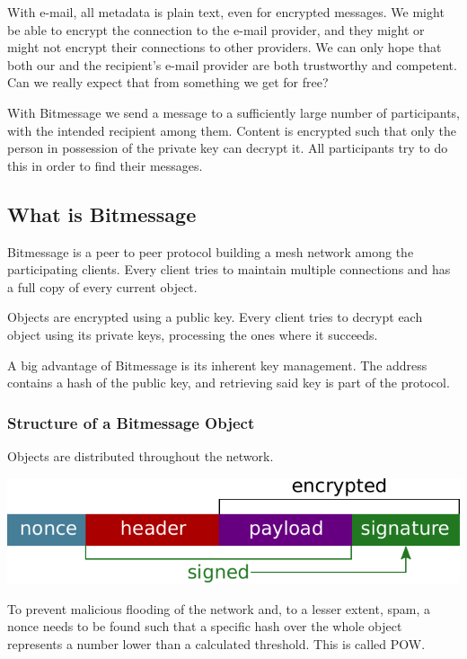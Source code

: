 \documentclass{bfh}
\begin{document}
  With e-mail, all metadata is plain text, even for encrypted messages. We might be able to encrypt the connection to the e-mail provider, and they might or might not encrypt their connections to other providers. We can only hope that both our and the recipient's e-mail provider are both trustworthy and competent. Can we really expect that from something we get for free?

  With Bitmessage we send a message to a sufficiently large number of participants, with the intended recipient among them. Content is encrypted such that only the person in possession of the private key can decrypt it. All participants try to do this in order to find their messages.

  \subsection{What is Bitmessage}
  
  Bitmessage is a peer to peer protocol building a mesh network among the participating clients. Every client tries to maintain multiple connections and has a full copy of every current object.
  
  Objects are encrypted using a public key. Every client tries to decrypt each object using its private keys, processing the ones where it succeeds.
  
  A big advantage of Bitmessage is its inherent key management. The address contains a hash of the public key, and retrieving said key is part of the protocol.

  \subsubsection{Structure of a Bitmessage Object}
  Objects are distributed throughout the network.

  \includegraphics[width=\textwidth]{images/object.pdf}

  To prevent malicious flooding of the network and, to a lesser extent, spam, a nonce needs to be found such that a specific hash over the whole object represents a number lower than a calculated threshold. This is called \ac{POW}.
\end{document}
